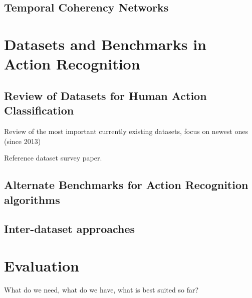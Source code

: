 \documentclass{scrartcl}
\begin{document}
\subsection{Temporal Coherency Networks}

\section{Datasets and Benchmarks in Action Recognition}

\subsection{Review of Datasets for Human Action Classification}
Review of the most important currently existing datasets, focus on newest ones (since 2013)

Reference dataset survey paper.

\subsection{Alternate Benchmarks for Action Recognition algorithms}

\subsection{Inter-dataset approaches}

\section{Evaluation}
What do we need, what do we have, what is best suited so far?
\end{document}
